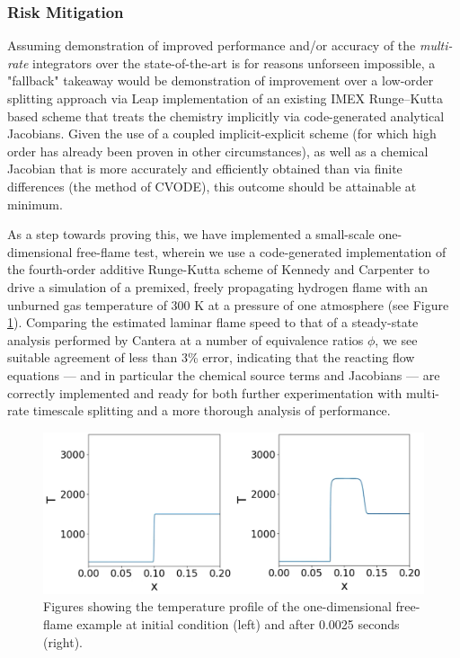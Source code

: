 \subsubsection{Risk Mitigation}

Assuming demonstration of improved
performance and/or accuracy of the \emph{multi-rate} integrators over the
state-of-the-art is for reasons unforseen impossible, a "fallback" takeaway
would be demonstration of improvement over a low-order splitting
approach via Leap implementation of an existing IMEX Runge--Kutta based scheme
\cite{kennedy2003additive} that treats the chemistry implicitly via code-generated
analytical Jacobians. Given the use of a coupled implicit-explicit scheme
(for which high order has already been proven in other circumstances),
as well as a chemical Jacobian that is more accurately and efficiently obtained
than via finite differences (the method of CVODE), this outcome should be attainable
at minimum.

As a step towards proving this, we have implemented a small-scale one-dimensional
free-flame test, wherein we use a code-generated implementation of the fourth-order
additive Runge-Kutta scheme of Kennedy and Carpenter to drive a simulation of
a premixed, freely propagating hydrogen flame with an unburned gas temperature
of 300 K at a pressure of one atmosphere (see Figure \ref{fig:freeflame_output}). Comparing the estimated laminar
flame speed to that of a steady-state analysis performed by Cantera at a number
of equivalence ratios $\phi$, we see suitable agreement of less than 3\% error, indicating
that the reacting flow equations --- and in particular the chemical source terms and Jacobians ---
are correctly implemented and ready for both further experimentation with multi-rate
timescale splitting and a more thorough analysis of performance.
\begin{figure}
\centering
\includegraphics[width=0.9\linewidth,trim=4 4 4 4,clip]{figures/flame_figures.png}
\caption{Figures showing the temperature profile of the one-dimensional free-flame example
         at initial condition (left) and after 0.0025 seconds (right).}
\label{fig:freeflame_output}
\end{figure}

